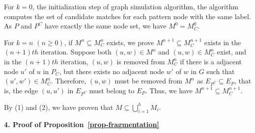 \vspace{-1.8ex}
 For $k=0$, \ie the initialization step of graph simulation algorithm,
the algorithm computes the set of candidate matches for each pattern node with the same label.
As $P$ and $P^{C}$ have exactly the same node set, we have $M^{0}= M_{C}^{0}$.

\vspace{-1.8ex}
 For $k=n$ $(n\geq 0)$, if $M^{n}\subseteq M_{C}^{n}$ exists, we prove $M^{n+1}\subseteq M_{C}^{n+1}$ exists in the $(n+1)th$ iteration.
Suppose both $(u,w)\in M^{n}$ and $(u,w)\in M_{C}^{n}$ exist,
and in the $(n+1)th$ iteration, $(u,w)$ is removed from $M_{C}^{n}$ if there is a adjacent node $u'$ of $u$ in $P_{C}$,
but there exists no adjacent node $w'$ of $w$ in $G$ such that $(u',w')\in M_{C}^{n}$.
Therefore, $(u,w)$ must be removed from $M^{n}$ as $E_{P^{C}} \subseteq E_{P}$,
that is, the edge $(u,u')$ in $E_{P^{C}}$ must belong to $E_{P}$.
Thus, we have $M^{n+1}\subseteq M_{C}^{n+1}$.

\vspace{-1.5ex}
By (1) and (2), we have proven that $M\subseteq\bigcup_{i=1}^{h}M_{i}$.


\noindent
{\textbf{4. Proof of Proposition~\ref{prop-fragmentation}}}

